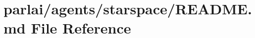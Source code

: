 \hypertarget{parlai_2agents_2starspace_2README_8md}{}\section{parlai/agents/starspace/\+R\+E\+A\+D\+ME.md File Reference}
\label{parlai_2agents_2starspace_2README_8md}
